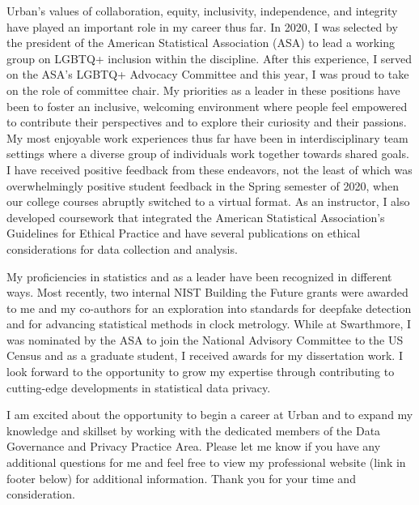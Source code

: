\documentclass[11pt,a4paper,sans]{moderncv}
\begin{document}
	Urban's values of collaboration, equity, inclusivity, independence, and integrity have played an important role in my career thus far. In 2020, I was selected by the president of the American Statistical Association (ASA) to lead a working group on LGBTQ+ inclusion within the discipline. After this experience, I served on the ASA's LGBTQ+ Advocacy Committee and this year, I was proud to take on the role of committee chair. My priorities as a leader in these positions have been to foster an inclusive, welcoming environment where people feel empowered to contribute their perspectives and to explore their curiosity and their passions. My most enjoyable work experiences thus far have been in interdisciplinary team settings where a diverse group of individuals work together towards shared goals. I have received positive feedback from these endeavors, not the least of which was overwhelmingly positive student feedback in the Spring semester of 2020, when our college courses abruptly switched to a virtual format. As an instructor, I also developed coursework that integrated the American Statistical Association's Guidelines for Ethical Practice and have several publications on ethical considerations for data collection and analysis.


	My proficiencies in statistics and as a leader have been recognized in different ways. Most recently, two internal NIST Building the Future grants were awarded to me and my co-authors for an exploration into standards for deepfake detection and for advancing statistical methods in clock metrology. While at Swarthmore, I was nominated by the ASA to join the National Advisory Committee to the US Census and as a graduate student, I received awards for my dissertation work. I look forward to the opportunity to grow my expertise through contributing to cutting-edge developments in statistical data privacy.


	I am excited about the opportunity to begin a career at Urban and to expand my knowledge and skillset by working with the dedicated members of the Data Governance and Privacy Practice Area. Please let me know if you have any additional questions for me and feel free to view my professional website (link in footer below) for additional information. Thank you for your time and consideration.\\
	
	\vspace{3mm}
	
	\makeletterclosing
	
\end{document}
